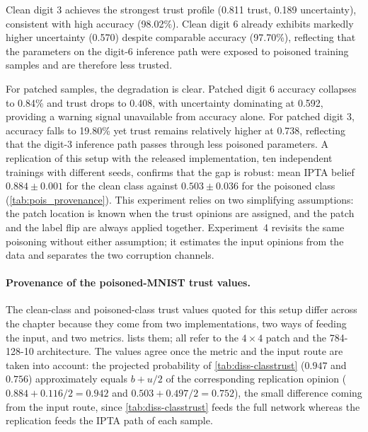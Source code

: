 Clean digit 3 achieves the strongest trust profile (0.811 trust, 0.189 uncertainty), consistent with high accuracy (98.02\%). Clean digit 6 already exhibits markedly higher uncertainty (0.570) despite comparable accuracy (97.70\%), reflecting that the parameters on the digit-6 inference path were exposed to poisoned training samples and are therefore less trusted.

For patched samples, the degradation is clear. Patched digit 6 accuracy collapses to 0.84\% and trust drops to 0.408, with uncertainty dominating at 0.592, providing a warning signal unavailable from accuracy alone. For patched digit 3, accuracy falls to 19.80\% yet trust remains relatively higher at 0.738, reflecting that the digit-3 inference path passes through less poisoned parameters. A replication of this setup with the released implementation, ten independent trainings with different seeds, confirms that the gap is robust: mean \ac{IPTA} belief $0.884 \pm 0.001$ for the clean class against $0.503 \pm 0.036$ for the poisoned class (\cref{tab:pois_provenance}). This experiment relies on two simplifying assumptions: the patch location is known when the trust opinions are assigned, and the patch and the label flip are always applied together. Experiment~4 revisits the same poisoning without either assumption; it estimates the input opinions from the data and separates the two corruption channels.

\paragraph*{Provenance of the poisoned-MNIST trust values.} The clean-class and poisoned-class trust values quoted for this setup differ across the chapter because they come from two implementations, two ways of feeding the input, and two metrics.  lists them; all refer to the $4\times4$ patch and the 784-128-10 architecture. The values agree once the metric and the input route are taken into account: the projected probability of \cref{tab:diss-classtrust} ($0.947$ and $0.756$) approximately equals $b + u/2$ of the corresponding replication opinion ($0.884 + 0.116/2 = 0.942$ and $0.503 + 0.497/2 = 0.752$), the small difference coming from the input route, since \cref{tab:diss-classtrust} feeds the full network whereas the replication feeds the \ac{IPTA} path of each sample.

